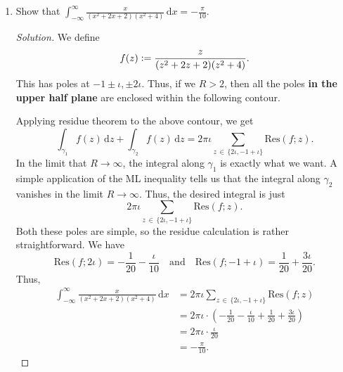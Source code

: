 \documentclass[11pt]{article}
\theoremstyle{definition}
\newenvironment{soln}{\begin{proof}[Solution]}{\end{proof}}
\begin{document}
\begin{enumerate}[leftmargin=*]
    \item Show that $\displaystyle\int_{-\infty}^{\infty} \frac{x}{(x^2+2x+2)(x^2+4)} \, \mathrm{d}x = -\frac{\pi}{10}$.
    
    \begin{soln}
        We define
        \[
            f(z) \vcentcolon= \frac{z}{(z^2+2z+2)(z^2+4)}.
        \]
        This has poles at $-1\pm\iota, \pm2\iota$. Thus, if we $R > 2$, then all the poles \textbf{in the upper half plane} are enclosed within the following contour. 
        
        \begin{center}
    	\end{center}
    	
    	Applying residue theorem to the above contour, we get
    	\[
    	    \int_{\gamma_1} f(z) \, \mathrm{d}z + \int_{\gamma_2} f(z) \, \mathrm{d}z = 2\pi\iota \sum_{z \, \in \, \{2\iota, -1+\iota\}} \text{Res}(f;z).
    	\]
    	In the limit that $R \to \infty$, the integral along $\gamma_1$ is exactly what we want. A simple application of the ML inequality tells us that the integral along $\gamma_2$ vanishes in the limit $R \to \infty$. Thus, the desired integral is just
    	\[
    	    2\pi\iota \sum_{z \, \in \, \{2\iota, -1+\iota\}} \text{Res}(f;z).
    	\]
    	Both these poles are simple, so the residue calculation is rather straightforward. We have
    	\[
    	    \text{Res}(f;2\iota) = -\frac{1}{20} - \frac{\iota}{10} \quad \text{and} \quad \text{Res}(f;-1+\iota) = \frac{1}{20} + \frac{3\iota}{20}.
    	\]
    	Thus, 
        \begin{align*}
            \int_{-\infty}^{\infty} \frac{x}{(x^2+2x+2)(x^2+4)} \, \mathrm{d}x &= 2\pi\iota \sum_{z \, \in \, \{2\iota, -1+\iota\}} \text{Res}(f;z) \\
            &= 2\pi\iota \cdot \left( -\frac{1}{20} - \frac{\iota}{10} + \frac{1}{20} + \frac{3\iota}{20} \right) \\
            &= 2\pi\iota \cdot \frac{\iota}{20} \\
            &= \boxed{-\frac{\pi}{10}.}
        \end{align*}
        

\end{soln}
\end{enumerate}
\end{document}
